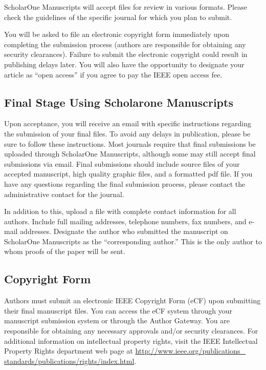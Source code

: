 \documentclass[journal]{IEEEtai}
\begin{document}
ScholarOne Manuscripts will accept files for review in various formats. Please check the guidelines of the specific journal for which you plan to submit. 

You will be asked to file an electronic copyright form immediately upon completing the submission process (authors are responsible for obtaining any security clearances). Failure to submit the electronic copyright could result in publishing delays later. You will also have the opportunity to designate your article as ``open access'' if you agree to pay the IEEE open access fee. 

\subsection{Final Stage Using Scholarone Manuscripts}

Upon acceptance, you will receive an email with specific instructions regarding the submission of your final files. To avoid any delays in publication, please be sure to follow these instructions. Most journals require that final submissions be uploaded through ScholarOne Manuscripts, although some may still accept final submissions via email. Final submissions should include source files of your accepted manuscript, high quality graphic files, and a formatted pdf file. If you have any questions regarding the final submission process, please contact the administrative contact for the journal. 

In addition to this, upload a file with complete contact information for all authors. Include full mailing addresses, telephone numbers, fax numbers, and e-mail addresses. Designate the author who submitted the manuscript on ScholarOne Manuscripts as the ``corresponding author.'' This is the only author to whom proofs of the paper will be sent. 

\subsection{Copyright Form}

Authors must submit an electronic IEEE Copyright Form (eCF) upon submitting their final manuscript files. You can access the eCF system through your manuscript submission system or through the Author Gateway. You are responsible for obtaining any necessary approvals and/or security clearances. For additional information on intellectual property rights, visit the IEEE Intellectual Property Rights department web page at \underline{http://www.ieee.org/publications\_} \underline{standards/publications/rights/index.html}. 
\end{document}
